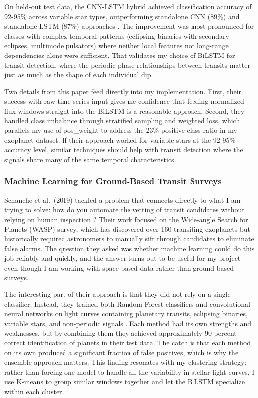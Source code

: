\documentclass[letterpaper]{article} %
\begin{document}
On held-out test data, the CNN-LSTM hybrid achieved classification accuracy of 92-95\% across variable star types, outperforming standalone CNN (89\%) and standalone LSTM (87\%) approaches \cite{Becker2021variablestars}. The improvement was most pronounced for classes with complex temporal patterns (eclipsing binaries with secondary eclipses, multimode pulsators) where neither local features nor long-range dependencies alone were sufficient. That validates my choice of BiLSTM for transit detection, where the periodic phase relationships between transits matter just as much as the shape of each individual dip.

Two details from this paper feed directly into my implementation. First, their success with raw time-series input gives me confidence that feeding normalized flux windows straight into the BiLSTM is a reasonable approach. Second, they handled class imbalance through stratified sampling and weighted loss, which parallels my use of pos\_weight to address the 23\% positive class ratio in my exoplanet dataset. If their approach worked for variable stars at the 92-95\% accuracy level, similar techniques should help with transit detection where the signals share many of the same temporal characteristics.

\subsubsection{Machine Learning for Ground-Based Transit Surveys}
Schanche et al.\ (2019) tackled a problem that connects directly to what I am trying to solve: how do you automate the vetting of transit candidates without relying on human inspection \cite{Schanche2019mlexoplanet}? Their work focused on the Wide-angle Search for Planets (WASP) survey, which has discovered over 160 transiting exoplanets but historically required astronomers to manually sift through candidates to eliminate false alarms. The question they asked was whether machine learning could do this job reliably and quickly, and the answer turns out to be useful for my project even though I am working with space-based data rather than ground-based surveys.

The interesting part of their approach is that they did not rely on a single classifier. Instead, they trained both Random Forest classifiers and convolutional neural networks on light curves containing planetary transits, eclipsing binaries, variable stars, and non-periodic signals \cite{Schanche2019mlexoplanet}. Each method had its own strengths and weaknesses, but by combining them they achieved approximately 90 percent correct identification of planets in their test data. The catch is that each method on its own produced a significant fraction of false positives, which is why the ensemble approach matters. This finding resonates with my clustering strategy: rather than forcing one model to handle all the variability in stellar light curves, I use K-means to group similar windows together and let the BiLSTM specialize within each cluster.
\end{document}
